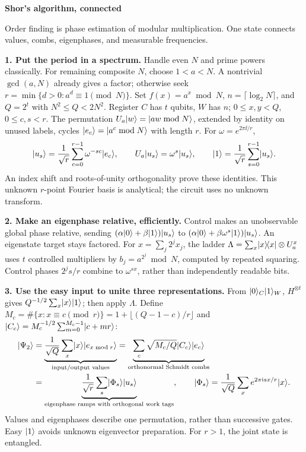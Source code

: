 \thispagestyle{empty}
\begingroup
\fontsize{9.3}{11.05}\selectfont
\setlength{\parskip}{3.2pt}
\setlength{\abovedisplayskip}{4pt}\setlength{\belowdisplayskip}{4pt}
\setlength{\abovedisplayshortskip}{2pt}\setlength{\belowdisplayshortskip}{2pt}
{\fontsize{18}{20}\selectfont\bfseries\color{ink}Shor's algorithm, connected}\par
{\color{accent}Order finding is phase estimation of modular multiplication. One state connects values, combs, eigenphases, and measurable frequencies.}\par

\textbf{1. Put the period in a spectrum.}
Handle even \(N\) and prime powers classically. For remaining composite \(N\), choose \(1<a<N\). A nontrivial \(\gcd(a,N)\) already gives a factor; otherwise seek \(r=\min\{d>0:a^d\equiv1\pmod N\}\). Set \(f(x)=a^x\bmod N\), \(n=\lceil\log_2N\rceil\), and \(Q=2^t\) with \(N^2\le Q<2N^2\). Register \(C\) has \(t\) qubits, \(W\) has \(n\); \(0\le x,y<Q\), \(0\le c,s<r\). The permutation \(U_a\lvert w\rangle=\lvert aw\bmod N\rangle\), extended by identity on unused labels, cycles \(\lvert e_c\rangle=\lvert a^c\bmod N\rangle\) with length \(r\). For \(\omega=e^{2\pi\ii/r}\),
\[
\lvert u_s\rangle=\frac1{\sqrt r}\sum_{c=0}^{r-1}\omega^{-sc}\lvert e_c\rangle,\qquad
U_a\lvert u_s\rangle=\omega^s\lvert u_s\rangle,\qquad
\lvert1\rangle=\frac1{\sqrt r}\sum_{s=0}^{r-1}\lvert u_s\rangle.
\]
An index shift and roots-of-unity orthogonality prove these identities. This unknown \(r\)-point Fourier basis is analytical; the circuit uses no unknown transform.

\textbf{2. Make an eigenphase relative, efficiently.}
Control makes an unobservable global phase relative, sending
\((\alpha\lvert0\rangle+\beta\lvert1\rangle)\lvert u_s\rangle\) to
\((\alpha\lvert0\rangle+\beta\omega^s\lvert1\rangle)\lvert u_s\rangle\). An eigenstate target stays factored. For \(x=\sum_j2^jx_j\), the ladder
\(\Lambda=\sum_x\lvert x\rangle\!\langle x\rvert\otimes U_a^x\) uses \(t\) controlled multipliers by \(b_j=a^{2^j}\bmod N\), computed by repeated squaring. Control phases \(2^js/r\) combine to \(\omega^{sx}\), rather than independently readable bits.

\textbf{3. Use the easy input to unite three representations.}
From \(\lvert0\rangle_C\lvert1\rangle_W\), \(H^{\otimes t}\) gives \(Q^{-1/2}\sum_x\lvert x\rangle\lvert1\rangle\); then apply \(\Lambda\). Define \(M_c=\#\{x:x\equiv c\pmod r\}=1+\lfloor(Q-1-c)/r\rfloor\) and \(\lvert C_c\rangle=M_c^{-1/2}\sum_{m=0}^{M_c-1}\lvert c+mr\rangle\):
\[
\begin{aligned}
\lvert\Psi_2\rangle
&=\underbrace{\frac1{\sqrt Q}\sum_x\lvert x\rangle\lvert e_{x\bmod r}\rangle}_{\text{input/output values}}
=\underbrace{\sum_c\sqrt{M_c/Q}\lvert C_c\rangle\lvert e_c\rangle}_{\text{orthonormal Schmidt combs}}\\[-1pt]
&=\underbrace{\frac1{\sqrt r}\sum_s\lvert\Phi_s\rangle\lvert u_s\rangle}_{\text{eigenphase ramps with orthogonal work tags}},
\qquad \lvert\Phi_s\rangle=\frac1{\sqrt Q}\sum_x e^{2\pi\mathrm{i} sx/r}\lvert x\rangle .
\end{aligned}
\]
Values and eigenphases describe one permutation, rather than successive gates. Easy \(\lvert1\rangle\) avoids unknown eigenvector preparation. For \(r>1\), the joint state is entangled.

